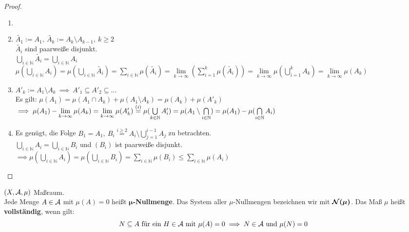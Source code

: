 \documentclass[11pt,a4paper,fleqn,openany]{report}
\begin{document}
    \begin{proof}
      \begin{enumerate}[label=(\roman*)]
        \item[]
        \item $\tilde{A_1} := A_1, \ \tilde{A_k} := A_k \setminus A_{k-1}, \ k \geq 2$\\
              $\tilde{A_i}$ sind paarweiße disjunkt.\\
              $\bigcup\limits_{i \in \mathbb{N}} \tilde{A_i} = \bigcup\limits_{i \in \mathbb{N}} A_i$\\
              $\mu(\bigcup\limits_{i \in \mathbb{N}} A_i) = \mu(\bigcup\limits_{i \in \mathbb{N}} \tilde{A_i}) = \sum\limits_{i \in \mathbb{N}} \mu(\tilde{A_i}) = \lim\limits_{k \to \infty}(\sum\limits_{i=1}^k \mu(\tilde{A_i})) = \lim\limits_{k \to \infty} \mu(\bigcup\limits_{i=1}^k A_k) = \lim\limits_{k \to \infty} \mu(A_k)$
        \item $A'_k := A_1 \setminus A_k \ \implies \ A'_1 \subseteq A'_2 \subseteq ...$\\
              Es gilt: $\mu(A_1) = \mu(A_1 \cap A_k) + \mu(A_1 \setminus A_k) = \mu(A_k) + \mu(A'_k)$\\
              $\implies \mu(A_1) - \lim\limits_{k \to \infty} \mu(A_k) = \lim\limits_{k \to \infty} \mu(A'_k) \stackrel{(i)}{=} \mu(\bigcup\limits_{k \in \mathbb{N}} A'_i) = \mu(A_1 \setminus \bigcap\limits_{i \in \mathbb{N}})\\ = \mu(A_1) - \mu(\bigcap\limits_{i \in \mathbb{N}} A_i)$
        \item Es genügt, die Folge $B_1 = A_1,\ B_i \stackrel{i \geq 2}{=} A_i \setminus \bigcup\limits_{j=1}^{i-1}A_j$ zu betrachten.\\
              $\bigcup\limits_{i \in \mathbb{N}} A_i = \bigcup\limits_{i \in \mathbb{N}} B_i$ und $(B_i)$ ist paarweiße disjunkt.\\
              $\implies \mu(\bigcup\limits_{i \in \mathbb{N}} A_i) = \mu(\bigcup\limits_{i \in \mathbb{N}} B_i) = \sum\limits_{i \in \mathbb{N}} \mu(B_i) \leq \sum\limits_{i \in \mathbb{N}} \mu(A_i)$
      \end{enumerate}
    \end{proof}

    \begin{definition}
      $(X, \mathcal{A}, \mu)$ Maßraum.\\
      Jede Menge $A \in \mathcal{A}$ mit $\mu(A) = 0$ heißt $\bm{\mu}$\textbf{-Nullmenge}. Das System aller $\mu$-Nullmengen bezeichnen wir mit $\bm{\mathcal{N}(\mu)}$. Das Maß $\mu$ heißt \textbf{vollständig}, wenn gilt:\\
      \[
        N \subseteq A \text{ für ein } H \in \mathcal{A} \text{ mit } \mu(A)=0\\
        \implies N \in \mathcal{A} \text{ und } \mu(N)=0
      \]
    \end{definition}
\end{document}
